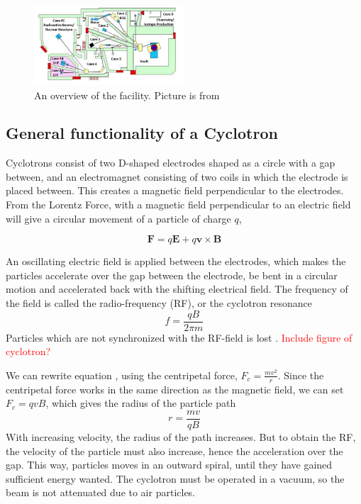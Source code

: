 \begin{figure}
    \centering
    \includegraphics[width=0.5\textwidth]{Experiment/LBL_88.png}
    \caption{An overview of the facility.  Picture is from \cite{KireeffCovo2018}}
    \label{fig:LBNL_88}
\end{figure}

\subsection{General functionality of a Cyclotron}
Cyclotrons consist of two D-shaped electrodes shaped as a circle with a gap between, and an electromagnet consisting of two coils in which the electrode is placed between. This creates a magnetic field perpendicular to the electrodes. 
From the Lorentz Force, with a magnetic field perpendicular to an electric field will give a circular movement of a particle of charge $q$,

\begin{equation} \label{eq:Lorentz}
    \textbf{F} = q\textbf{E} + q\textbf{v} \times \textbf{B}
\end{equation}

An oscillating electric field is applied between the electrodes, which makes the particles accelerate over the gap between the electrode, be bent in a circular motion and accelerated back with the shifting electrical field. The frequency of the field is called the radio-frequency (RF), or the cyclotron resonance
\begin{equation}
    f = \frac{qB}{2\pi m}
\end{equation}
Particles which are not synchronized with the RF-field is lost \cite{KireeffCovo2018}. \textcolor{red}{Include figure of cyclotron?}  

We can rewrite equation \label{eq:Lorentz}, using the centripetal force, $F_c = \frac{mv^2}{r}$. Since the centripetal force works in the same direction as the magnetic field, we can set $F_c=qvB$, which gives the radius of the particle path 
\begin{equation}
    r = \frac{mv}{qB}
\end{equation}
With increasing velocity, the radius of the path increases. But to obtain the RF, the velocity of the particle must also increase, hence the acceleration over the gap. This way, particles moves in an outward spiral, until they have gained sufficient energy wanted. The cyclotron must be operated in a vacuum, so the beam is not attenuated due to air particles. 


